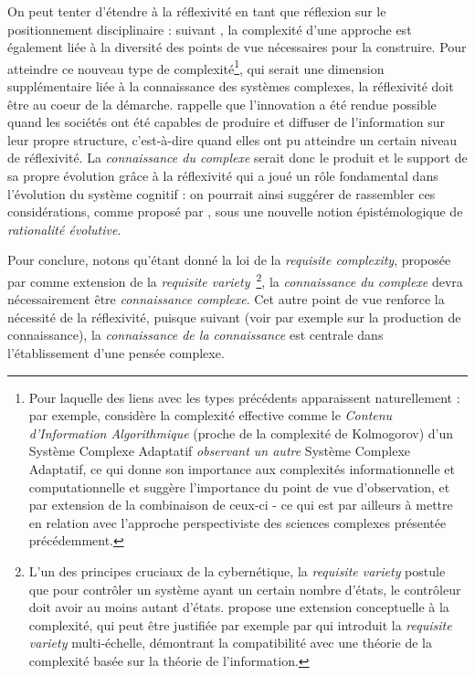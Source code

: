On peut tenter d'étendre à la réflexivité en tant que réflexion sur le positionnement disciplinaire : suivant \cite{pumain2005cumulativite}, la complexité d'une approche est également liée à la diversité des points de vue nécessaires pour la construire. Pour atteindre ce nouveau type de complexité\footnote{Pour laquelle des liens avec les types précédents apparaissent naturellement : par exemple, \cite{gell1995quark} considère la complexité effective comme le \emph{Contenu d'Information Algorithmique} (proche de la complexité de Kolmogorov) d'un Système Complexe Adaptatif \emph{observant un autre} Système Complexe Adaptatif, ce qui donne son importance aux complexités informationnelle et computationnelle et suggère l'importance du point de vue d'observation, et par extension de la combinaison de ceux-ci - ce qui est par ailleurs à mettre en relation avec l'approche perspectiviste des sciences complexes présentée précédemment.}, qui serait une dimension supplémentaire liée à la connaissance des systèmes complexes, la réflexivité doit être au coeur de la démarche. \cite{read2009innovation} rappelle que l'innovation a été rendue possible quand les sociétés ont été capables de produire et diffuser de l'information sur leur propre structure, c'est-à-dire quand elles ont pu atteindre un certain niveau de réflexivité. La \emph{connaissance du complexe} serait donc le produit et le support de sa propre évolution grâce à la réflexivité qui a joué un rôle fondamental dans l'évolution du système cognitif : on pourrait ainsi suggérer de rassembler ces considérations, comme proposé par , sous une nouvelle notion épistémologique de \emph{rationalité évolutive}.


Pour conclure, notons qu'étant donné la loi de la \emph{requisite complexity}, proposée par \cite{gershenson2015requisite} comme extension de la \emph{requisite variety}~\cite{ashby1991requisite}\footnote{L'un des principes cruciaux de la cybernétique, la \emph{requisite variety} postule que pour contrôler un système ayant un certain nombre d'états, le contrôleur doit avoir au moins autant d'états.  propose une extension conceptuelle à la complexité, qui peut être justifiée par exemple par \cite{allen2017multiscale} qui introduit la \emph{requisite variety} multi-échelle, démontrant la compatibilité avec une théorie de la complexité basée sur la théorie de l'information.}, la \emph{connaissance du complexe} devra nécessairement être \emph{connaissance complexe}. Cet autre point de vue renforce la nécessité de la réflexivité, puisque suivant  (voir par exemple \cite{morin1991methode} sur la production de connaissance), la \emph{connaissance de la connaissance} est centrale dans l'établissement d'une pensée complexe.




